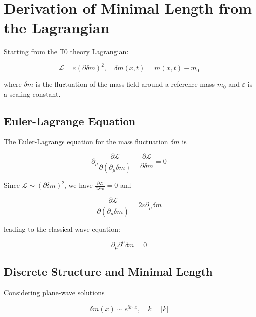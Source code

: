 \documentclass[12pt,a4paper]{article}
\numberwithin{equation}{section}
\begin{document}
	\section{Derivation of Minimal Length from the Lagrangian}
	
	Starting from the T0 theory Lagrangian:
	
	\begin{equation}
		\mathcal{L} = \varepsilon (\partial \delta m)^2, \quad \delta m(x,t) = m(x,t) - m_0
	\end{equation}
	
	where $\delta m$ is the fluctuation of the mass field around a reference mass $m_0$ and $\varepsilon$ is a scaling constant.
	
	\subsection{Euler-Lagrange Equation}
	
	The Euler-Lagrange equation for the mass fluctuation $\delta m$ is
	
	\begin{equation}
		\partial_\mu \frac{\partial \mathcal{L}}{\partial (\partial_\mu \delta m)} - \frac{\partial \mathcal{L}}{\partial \delta m} = 0
	\end{equation}
	
	Since $\mathcal{L} \sim (\partial \delta m)^2$, we have $\frac{\partial \mathcal{L}}{\partial \delta m} = 0$ and
	
	\begin{equation}
		\frac{\partial \mathcal{L}}{\partial (\partial_\mu \delta m)} = 2 \varepsilon \partial_\mu \delta m
	\end{equation}
	
	leading to the classical wave equation:
	
	\begin{equation}
		\partial_\mu \partial^\mu \delta m = 0
	\end{equation}
	
	\subsection{Discrete Structure and Minimal Length}
	
	Considering plane-wave solutions
	
	\begin{equation}
		\delta m(x) \sim e^{i k \cdot x}, \quad k = |k|
	\end{equation}
	
\end{document}
